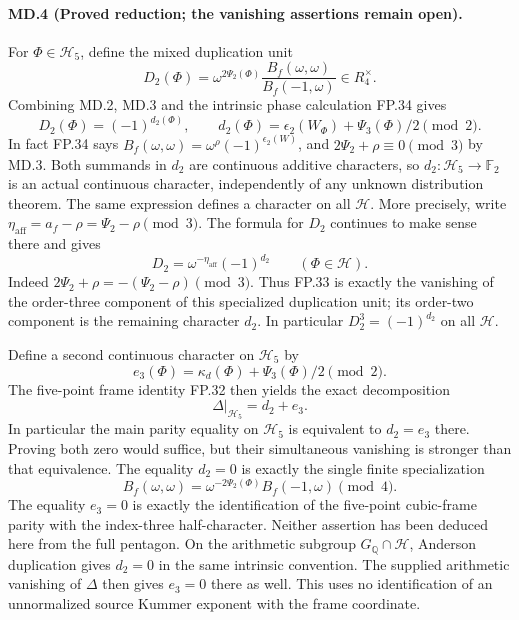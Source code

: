 \paragraph{MD.4 (Proved reduction; the vanishing assertions remain open).}
For $\Phi\in\mathcal H_5$, define the mixed duplication unit
\[
 D_2(\Phi)=
 \omega^{2\Psi_2(\Phi)}
       \frac{B_f(\omega,\omega)}{B_f(-1,\omega)}\in R_4^\times.
 \tag{MD.4a}
\]
Combining MD.2, MD.3 and the intrinsic phase calculation FP.34 gives
\[
 \boxed{\quad
 D_2(\Phi)=(-1)^{d_2(\Phi)},\qquad
 d_2(\Phi)=\epsilon_2(W_\Phi)+\Psi_3(\Phi)/2\pmod2.
 \quad}
 \tag{MD.4b}
\]
In fact FP.34 says
$B_f(\omega,\omega)=\omega^\rho(-1)^{\epsilon_2(W)}$,
and $2\Psi_2+\rho\equiv0\pmod3$ by MD.3.
Both summands in $d_2$ are continuous additive characters, so
$d_2:\mathcal H_5\to\mathbb F_2$ is an actual continuous
character, independently of any unknown distribution theorem.
The same expression defines a character on all $\mathcal H$.
More precisely, write
$\eta_{\mathrm{aff}}=a_f-\rho=\Psi_2-\rho\pmod3$.
The formula for $D_2$ continues to make sense there and gives
\[
 D_2=\omega^{-\eta_{\mathrm{aff}}}(-1)^{d_2}
 \qquad(\Phi\in\mathcal H).
 \tag{MD.4b$'$}
\]
Indeed $2\Psi_2+\rho=-(\Psi_2-\rho)\pmod3$.
Thus FP.33 is exactly the vanishing of the order-three component
of this specialized duplication unit; its order-two component is
the remaining character $d_2$. In particular $D_2^3=(-1)^{d_2}$
on all $\mathcal H$.

Define a second continuous character on $\mathcal H_5$ by
\[
 e_3(\Phi)=\kappa_d(\Phi)+\Psi_3(\Phi)/2\pmod2.
 \tag{MD.4c}
\]
The five-point frame identity FP.32 then yields the exact decomposition
\[
 \boxed{\quad\Delta|_{\mathcal H_5}=d_2+e_3.\quad}
 \tag{MD.4d}
\]
In particular the main parity equality on $\mathcal H_5$ is
equivalent to $d_2=e_3$ there. Proving both zero would suffice,
but their simultaneous vanishing is stronger than that equivalence.
The equality $d_2=0$ is exactly the single finite specialization
\[
 B_f(\omega,\omega)
       =\omega^{-2\Psi_2(\Phi)}B_f(-1,\omega)\pmod4.
 \tag{MD.4e}
\]
The equality $e_3=0$ is exactly the identification of the
five-point cubic-frame parity with the index-three half-character.
Neither assertion has been deduced here from the full pentagon.
On the arithmetic subgroup $G_{\mathbb Q}\cap\mathcal H$,
Anderson duplication gives $d_2=0$ in the same intrinsic
convention. The supplied arithmetic vanishing of $\Delta$
then gives $e_3=0$ there as well. This uses no identification
of an unnormalized source Kummer exponent with the frame coordinate.

